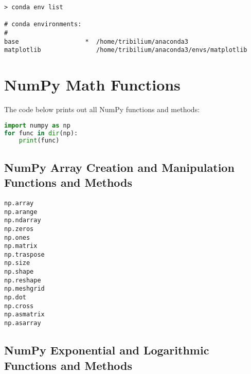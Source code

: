 \documentclass{book}
\newenvironment{key_terms}{\begin{multicols}{3}}{\end{multicols}} %
\begin{document}
\begin{lstlisting}
> conda env list

# conda environments:
#
base                  *  /home/tribilium/anaconda3
matplotlib               /home/tribilium/anaconda3/envs/matplotlib
\end{lstlisting}
    




    
        \hypertarget{numpy-math-functions}{%
\section{NumPy Math Functions}\label{numpy-math-functions}}
    




    
        The code below prints out all NumPy functions and methods:

\begin{lstlisting}[language=Python]
import numpy as np
for func in dir(np):
    print(func)
\end{lstlisting}
    




    
        \hypertarget{numpy-array-creation-and-manipulation-functions-and-methods}{%
\subsection{NumPy Array Creation and Manipulation Functions and
Methods}\label{numpy-array-creation-and-manipulation-functions-and-methods}}
    




    
        \begin{key_terms}
        \begin{lstlisting}
np.array
np.arange
np.ndarray
np.zeros
np.ones
np.matrix
np.traspose
np.size
np.shape
np.reshape
np.meshgrid
np.dot
np.cross
np.asmatrix
np.asarray
\end{lstlisting}
        \end{key_terms}

    




    
        \hypertarget{numpy-exponential-and-logarithmic-functions-and-methods}{%
\subsection{NumPy Exponential and Logarithmic Functions and
Methods}\label{numpy-exponential-and-logarithmic-functions-and-methods}}
    
\end{document}
